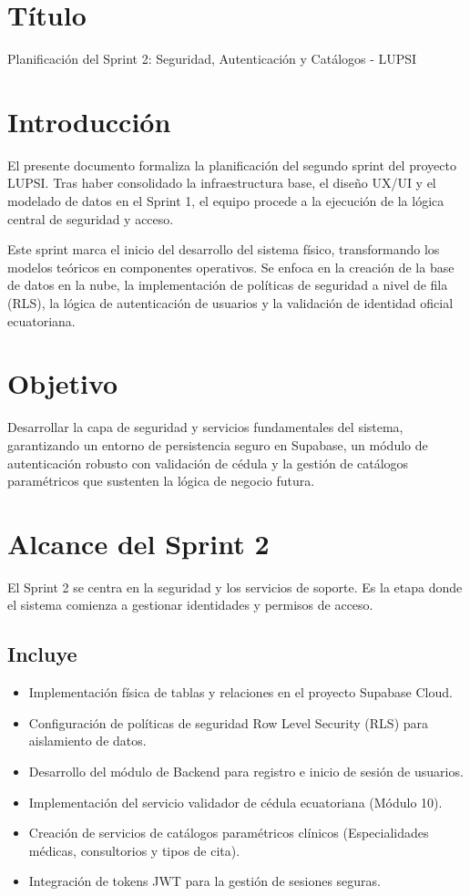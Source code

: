 \documentclass[a4paper,12pt]{article}
\begin{document}
\raggedbottom

\section{Título}
Planificación del Sprint 2: Seguridad, Autenticación y Catálogos - LUPSI

\section{Introducción}
El presente documento formaliza la planificación del segundo sprint del proyecto LUPSI. Tras haber consolidado la infraestructura base, el diseño UX/UI y el modelado de datos en el Sprint 1, el equipo procede a la ejecución de la lógica central de seguridad y acceso.

Este sprint marca el inicio del desarrollo del sistema físico, transformando los modelos teóricos en componentes operativos. Se enfoca en la creación de la base de datos en la nube, la implementación de políticas de seguridad a nivel de fila (RLS), la lógica de autenticación de usuarios y la validación de identidad oficial ecuatoriana.

\section{Objetivo}
Desarrollar la capa de seguridad y servicios fundamentales del sistema, garantizando un entorno de persistencia seguro en Supabase, un módulo de autenticación robusto con validación de cédula y la gestión de catálogos paramétricos que sustenten la lógica de negocio futura.

\section{Alcance del Sprint 2}
El Sprint 2 se centra en la seguridad y los servicios de soporte. Es la etapa donde el sistema comienza a gestionar identidades y permisos de acceso.

\subsection{Incluye}
\begin{itemize}
    \item Implementación física de tablas y relaciones en el proyecto Supabase Cloud.
    \item Configuración de políticas de seguridad Row Level Security (RLS) para aislamiento de datos.
    \item Desarrollo del módulo de Backend para registro e inicio de sesión de usuarios.
    \item Implementación del servicio validador de cédula ecuatoriana (Módulo 10).
    \item Creación de servicios de catálogos paramétricos clínicos (Especialidades médicas, consultorios y tipos de cita).
    \item Integración de tokens JWT para la gestión de sesiones seguras.
\end{itemize}
\end{document}
